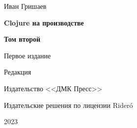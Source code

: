 
\begin{titlepage}

\begin{center}

  {Иван Гришаев}

  \vspace*{5cm}

  {\Large\textbf{Clojure на производстве}}

  \vspace{1mm}

  {\Large\textbf{Том второй}}

  \vspace{7mm}

  {\Large Первое издание}

  {\small Редакция \COMMITHASH}

  \vspace*{\fill}

  \ifdmk
  Издательство <<ДМК Пресс>>
  \fi

  \ifridero
  {Издательские решения по лицензии Rider\'{o}}
  \fi

  {2023}

\end{center}

\end{titlepage}
